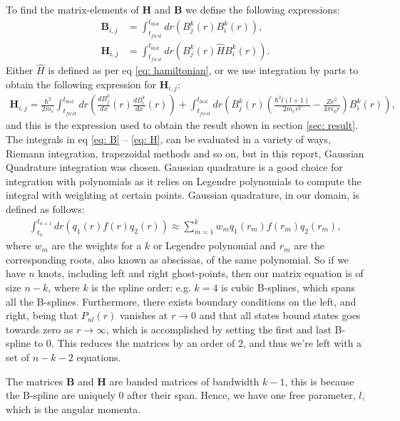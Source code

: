 \documentclass[a4paper]{article}
\newcommand{\newparagraph}{\vspace{.5cm}\noindent}
\begin{document}
\newparagraph
To find the matrix-elements of $\mathbf{H}$ and $\mathbf{B}$ we define the following expressions:
\begin{align}
    \mathbf{B}_{i, j} &= \int_{t_{first}}^{t_{last}}dr\left(B_{j}^k(r)B_i^k(r)\right),\label{eq: B}\\
    \mathbf{H}_{i, j} &= \int_{t_{first}}^{t_{last}}dr\left(B_{j}^k(r)\hat{H}B_i^k(r)\right).\nonumber
\end{align}Either $\hat{H}$ is defined as per eq \eqref{eq: hamiltonian}, or we use integration by parts to obtain the following expression for $\mathbf{H}_{i,j}$:
\begin{align}
    \mathbf{H}_{i,j} = \frac{\hbar^2}{2m_e}\int_{t_{first}}^{t_{last}}dr\left(\frac{dB_j^k}{dx}(r)\frac{dB_i^k}{dx}(r)\right) + \int_{t_{first}}^{t_{last}}dr\left(B_j^k(r)\left(\frac{\hbar^2l(l + 1)}{2m_er^2} - \frac{Ze^2}{4\pi\epsilon_0r}\right)B_i^k(r)\right),\label{eq: H}
\end{align}and this is the expression used to obtain the result shown in section \ref{sec: result}.
The integrals in eq \eqref{eq: B} -- \eqref{eq: H}, can be evaluated in a variety of ways, Riemann integration, trapezoidal methods and so on, but in this report, Gaussian Quadrature integration was chosen.
Gaussian quadrature is a good choice for integration with polynomials as it relies on Legendre polynomials to compute the integral with weighting at certain points.
Gaussian quadrature, in our domain, is defined as follows:
\begin{align}
    \int_{t_n}^{t_{n+ 1}}dr\left(q_1(r)f(r)q_2(r)\right) \approx \sum_{m = 1}^k w_m q_1(r_m)f(r_m)q_2(r_m),\label{eq: gauss-quad}
\end{align}where $w_m$ are the weights for a $k$ or Legendre polynomial and $r_m$ are the corresponding roots, also known as abscissas, of the same polynomial.
So if we have $n$ knots, including left and right ghost-points, then our matrix equation is of size $n - k$, where $k$ is the spline order: e.g. $k = 4$ is cubic B-splines, which spans all the B-splines.
Furthermore, there exists boundary conditions on the left, and right, being that $P_{nl}(r)$ vanishes at $r\to 0$ and that all states bound states goes towards zero as $r\to\infty$, which is accomplished by setting the first and last B-spline to $0$.
This reduces the matrices by an order of $2$, and thus we're left with a set of $n - k - 2$ equations.

\newparagraph
The matrices $\mathbf{B}$ and $\mathbf{H}$ are banded matrices of bandwidth $k - 1$, this is because the B-spline are uniquely $0$ after their span. 
Hence, we have one free parameter, $l$, which is the angular momenta.
\end{document}
